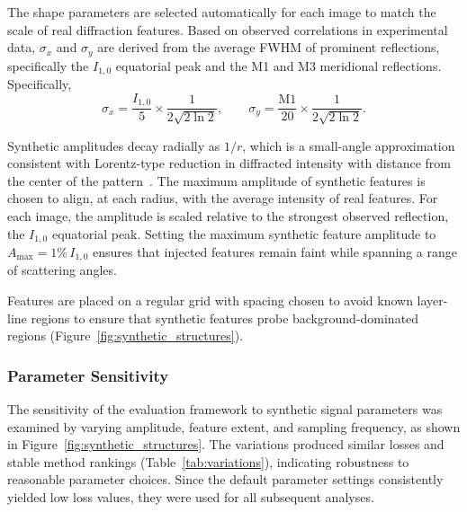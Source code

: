 \documentclass[11pt,onecolumn]{IEEEtran}
\begin{document}
The shape parameters are selected automatically for each image to match the scale of real diffraction features. Based on observed correlations in experimental data, $\sigma_x$ and $\sigma_y$ are derived from the average FWHM of prominent reflections, specifically the $I_{1,0}$ equatorial peak and the M1 and M3 meridional reflections. Specifically,
\begin{equation}
\sigma_x = \frac{I_{1,0}}{5} \times \frac{1}{2\sqrt{2\ln2}}, 
\qquad
\sigma_y = \frac{\mathrm{M1}}{20} \times \frac{1}{2\sqrt{2\ln2}}.
\end{equation}


Synthetic amplitudes decay radially as $1/r$, which is a small-angle approximation consistent with Lorentz-type reduction in diffracted intensity with distance from the center of the pattern~\cite{Buerger1940,Denny1995}. The maximum amplitude of synthetic features is chosen to align, at each radius, with the average intensity of real features. For each image, the amplitude is scaled relative to the strongest observed reflection, the $I_{1,0}$ equatorial peak. Setting the maximum synthetic feature amplitude to $A_{\mathrm{max}} = 1\%\, I_{1,0}$ ensures that injected features remain faint while spanning a range of scattering angles.

Features are placed on a regular grid with spacing chosen to avoid known layer-line regions to ensure that synthetic features probe background-dominated regions (Figure~\ref{fig:synthetic_structures}).

\subsubsection{Parameter Sensitivity}

The sensitivity of the evaluation framework to synthetic signal parameters was examined by varying amplitude, feature extent, and sampling frequency, as shown in Figure~\ref{fig:synthetic_structures}. The variations produced similar losses and stable method rankings (Table~\ref{tab:variations}), indicating robustness to reasonable parameter choices. Since the default parameter settings consistently yielded low loss values, they were used for all subsequent analyses.
\end{document}
